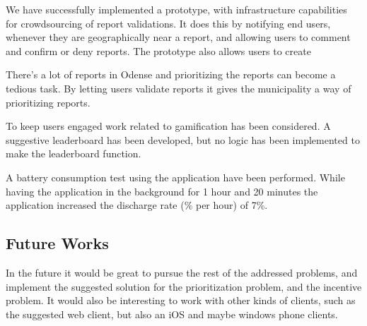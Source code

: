 
We have successfully implemented a prototype, with infrastructure capabilities for crowdsourcing of report validations. It does this by notifying end users, whenever they are geographically near a report, and allowing users to comment and confirm or deny reports. The prototype also allows users to create 

There’s a lot of reports in Odense \cite{odense} and prioritizing the reports can become a tedious task. By letting users validate reports it gives the municipality a way of prioritizing reports. 

To keep users engaged work related to gamification has been considered. A suggestive leaderboard has been developed, but no logic has been implemented to make the leaderboard function. 

A battery consumption test using the application have been performed. While having the application in the background for 1 hour and 20 minutes the application increased the discharge rate (\% per hour) of 7\%. 


\subsection*{Future Works}
In the future it would be great to pursue the rest of the addressed problems, and implement the suggested solution for the prioritization problem, and the incentive problem.
It would also be interesting to work with other kinds of clients, such as the suggested web client, but also an iOS and maybe windows phone clients. 

